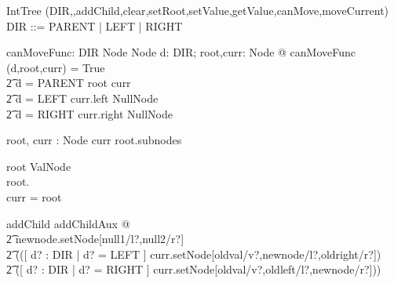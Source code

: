 \documentclass{article}
\begin{document}
\begin{class}{IntTree}
\visibility (DIR,\Init,addChild,clear,setRoot,setValue,getValue,canMove,moveCurrent) \\
DIR ::= PARENT | LEFT | RIGHT\classbreak
\begin{axdef}
	canMoveFunc: DIR \cross Node \cross Node \fun \bool
\where
	\forall d: DIR; root,curr: Node @ canMoveFunc (d,root,curr) = True \iff \\
		\t2 d = PARENT \land root \neq curr \lor \\
		\t2 d = LEFT \land curr.left \notin NullNode \lor \\
		\t2 d = RIGHT \land curr.right \notin NullNode
\end{axdef}\classbreak
\begin{state}
	root, curr : Node
\where
	curr \in root.subnodes
\end{state}\classbreak
\begin{init}
	root \in ValNode \\
        root.\Init \\
        curr = root
\end{init}\classbreak
{}\classbreak
addChild \sdef addChildAux @ \\
	\t2 newnode.setNode[null1/l?,null2/r?] \land \\
	\t2 (([ d? : DIR | d? = LEFT ]
		\land curr.setNode[oldval/v?,newnode/l?,oldright/r?]) \gch \\
	\t2 ([ d? : DIR | d? = RIGHT ]
		\land curr.setNode[oldval/v?,oldleft/l?,newnode/r?]))\\
\end{class}
\end{document}
